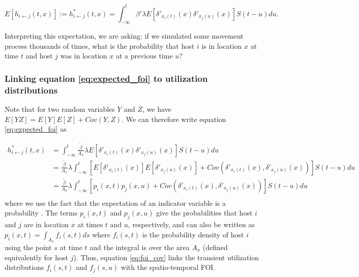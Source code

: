 \documentclass[letterpaper]{article}
\begin{document}
\begin{equation}
    E[h_{i \leftarrow j}(t, x)] := h^*_{i \leftarrow j}(t, x) = \int_{-\infty}^{t} \beta' \lambda E[\delta'_{x_i(t)}(x) \delta'_{x_j(u)}(x)] S(t - u) du.
    \label{eq:expected_foi}
\end{equation}

Interpreting this expectation, we are asking: if we simulated some movement process thousands of times, what is the probability that host $i$ is in location $x$ at time $t$ and host $j$ was in location $x$ at a previous time $u$? 

\subsubsection*{Linking equation \ref{eq:expected_foi} to utilization distributions}

Note that for two random variables $Y$ and $Z$, we have $E[YZ] = E[Y]E[Z] + Cov(Y, Z)$.  We can therefore write equation \ref{eq:expected_foi} as

\begin{equation}
    \begin{aligned}
        h^*_{i \leftarrow j}(t, x) &= \int_{-\infty}^{t} \frac{\tilde{\beta}}{A_x} \lambda E[\delta'_{x_i(t)}(x) \delta'_{x_j(u)}(x)] S(t - u) du \\
        &= \frac{\tilde{\beta}}{A_x} \lambda \int_{-\infty}^{t} [E[\delta'_{x_i(t)}(x)] E[\delta'_{x_j(u)}(x)] + Cov(\delta'_{x_i(t)}(x), \delta'_{x_j(u)}(x))] S(t - u) du \\
        &= \frac{\tilde{\beta}}{A_x} \lambda \int_{-\infty}^{t} [p_i(x, t) p_j(x, u) + Cov(\delta'_{x_i(t)}(x), \delta'_{x_j(u)}(x))] S(t - u) du \\
    \end{aligned}
    \label{eq:foi_cov}
\end{equation}
where we use the fact that the expectation of an indicator variable is a probability \citep{Grimmett2001}. The terms $p_i(x, t)$ and $p_j(x,u)$ give the probabilities that host $i$ and $j$ are in location $x$ at times $t$ and $u$, respectively, and can also be written as $p_i(x, t) = \int_{A_x} f_i(s, t) ds$ where $f_i(s, t)$ is the probability density of host $i$ using the point $s$ at time $t$ and the integral is over the area $A_x$ (defined equivalently for host $j$). Thus, equation \ref{eq:foi_cov} links the transient utilization distributions $f_i(s, t)$ and $f_j(s, u)$ with the spatio-temporal FOI.
\end{document}
